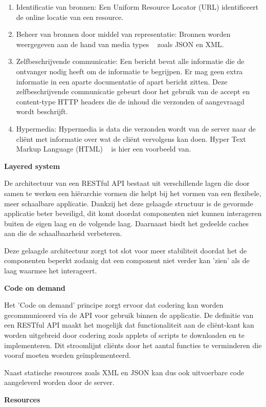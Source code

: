 \begin{enumerate}
\item Identificatie van bronnen: Een Uniform Resource Locator (URL) identificeert de online locatie van een resource.
\item Beheer van bronnen door middel van representatie: Bronnen worden weergegeven aan de hand van media types ~\autocite{N.Freed1996} zoals JSON en XML.
\item Zelfbeschrijvende communicatie: Een bericht bevat alle informatie die de ontvanger nodig heeft om de informatie te begrijpen. Er mag geen extra informatie in een aparte documentatie of apart bericht zitten. Deze zelfbeschrijvende communicatie gebeurt door het gebruik van de accept en content-type HTTP headers die de inhoud die verzonden of aangevraagd wordt beschrijft.
\item Hypermedia: Hypermedia is data die verzonden wordt van de server naar de cliënt met informatie over wat de cliënt vervolgens kan doen. Hyper Text Markup Language (HTML) ~\autocite{W3schools} is hier een voorbeeld van.
\end{enumerate}
\textbf{Layered system}

De architectuur van een RESTful API bestaat uit verschillende lagen die door samen te werken een hiërarchie vormen die helpt bij het vormen van een flexibele, meer schaalbare applicatie. Dankzij het deze gelaagde structuur is de gevormde applicatie beter beveiligd, dit komt doordat componenten niet kunnen interageren buiten de eigen laag en de volgende laag. Daarnaast biedt het gedeelde caches aan die de schaalbaarheid verbeteren.

Deze gelaagde architectuur zorgt tot slot voor meer stabiliteit doordat het de componenten beperkt zodanig dat een component niet verder kan 'zien' als de laag waarmee het interageert.

\textbf{Code on demand}

Het 'Code on demand' principe zorgt ervoor dat codering kan worden gecommuniceerd via de API voor gebruik binnen de applicatie. De definitie van een RESTful API maakt het mogelijk dat functionaliteit aan de cliënt-kant kan worden uitgebreid door codering zoals applets of scripts te downloaden en te implementeren. Dit stroomlijnt cliënts door het aantal functies te verminderen die vooraf moeten worden geïmplementeerd.

Naast statische resources zoals XML en JSON kan dus ook uitvoerbare code aangeleverd worden door de server.

\textbf{Resources}

